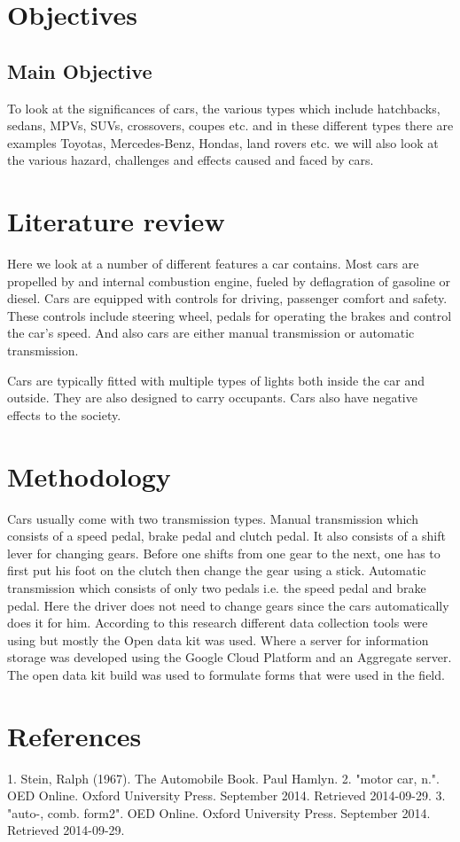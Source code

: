 \documentclass[12pt]{article}
\begin{document}
\section{Objectives}
\subsection{Main Objective}
To look at the significances of cars, the various types which include hatchbacks, sedans, MPVs, SUVs, crossovers, coupes etc. and in these different types there are examples Toyotas, Mercedes-Benz, Hondas, land rovers etc. we will also look at the various hazard, challenges and effects caused and faced by cars.

\section{Literature review}
Here we look at a number of different features a car contains. Most cars are propelled by and internal combustion engine, fueled by deflagration of gasoline or diesel. Cars are equipped with controls for driving, passenger comfort and safety. These controls include steering wheel, pedals for operating the brakes and control the car’s speed. And also cars are either manual transmission or automatic transmission.
	
Cars are typically fitted with multiple types of lights both inside the car and outside. They are also designed to carry occupants.
Cars also have negative effects to the society.

\section{Methodology}
Cars usually come with two transmission types. Manual transmission which consists of a speed pedal, brake pedal and clutch pedal. It also consists of a shift lever for changing gears. Before one shifts from one gear to the next, one has to first put his foot on the clutch then change the gear using a stick. 
Automatic transmission which consists of only two pedals i.e. the speed pedal and brake pedal. Here the driver does not need to change gears since the cars automatically does it for him.
According to this research different data collection tools were using but mostly the Open data kit was used. Where a server for information storage was developed using the Google Cloud Platform and an Aggregate server. The open data kit build was used to formulate forms that were used in the field.

\section{References}
1. Stein, Ralph (1967). The Automobile Book. Paul Hamlyn.
2. "motor car, n.". OED Online. Oxford University Press. September 2014. Retrieved 2014-09-29.
3. "auto-, comb. form2". OED Online. Oxford University Press. September 2014. Retrieved 2014-09-29.
\end{document}
